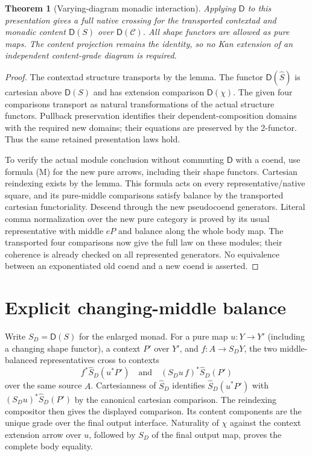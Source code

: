 \documentclass[11pt]{article}
\newtheorem{theorem}{Theorem}\newtheorem{lemma}{Lemma}
\begin{document}
\begin{theorem}[Varying-diagram monadic interaction]
Applying $\mathsf D$ to this presentation gives a full native crossing for the transported contextad and monadic content $\mathsf D(S)$ over $\mathsf D(\mathcal C)$. All shape functors are allowed as pure maps. The content projection remains the identity, so no Kan extension of an independent content-grade diagram is required.
\end{theorem}
\begin{proof}
The contextad structure transports by the lemma. The functor $\mathsf D(\widehat S)$ is cartesian above $\mathsf D(S)$ and has extension comparison $\mathsf D(\chi)$. The given four comparisons transport as natural transformations of the actual structure functors. Pullback preservation identifies their dependent-composition domains with the required new domains; their equations are preserved by the 2-functor. Thus the same retained presentation laws hold.

To verify the actual module conclusion without commuting $\mathsf D$ with a coend, use formula (M) for the new pure arrows, including their shape functors. Cartesian reindexing exists by the lemma. This formula acts on every representative/native square, and its pure-middle comparisons satisfy balance by the transported cartesian functoriality. Descend through the new pseudocoend generators. Literal comma normalization over the new pure category is proved by its usual representative with middle $eP$ and balance along the whole body map. The transported four comparisons now give the full law on these modules; their coherence is already checked on all represented generators. No equivalence between an exponentiated old coend and a new coend is asserted.
\end{proof}

\section{Explicit changing-middle balance}
Write $S_D=\mathsf D(S)$ for the enlarged monad. For a pure map $u:Y\to Y'$ (including a changing shape functor), a context $P'$ over $Y'$, and $f:A\to S_DY$, the two middle-balanced representatives cross to contexts
\[
 f^*\widehat S_D(u^*P')\quad\text{and}\quad
 (S_Du\,f)^*\widehat S_D(P')
\]
over the same source $A$. Cartesianness of $\widehat S_D$ identifies $\widehat S_D(u^*P')$ with $(S_Du)^*\widehat S_D(P')$ by the canonical cartesian comparison. The reindexing compositor then gives the displayed comparison. Its content components are the unique grade over the final output interface. Naturality of $\chi$ against the context extension arrow over $u$, followed by $S_D$ of the final output map, proves the complete body equality.
\end{document}
